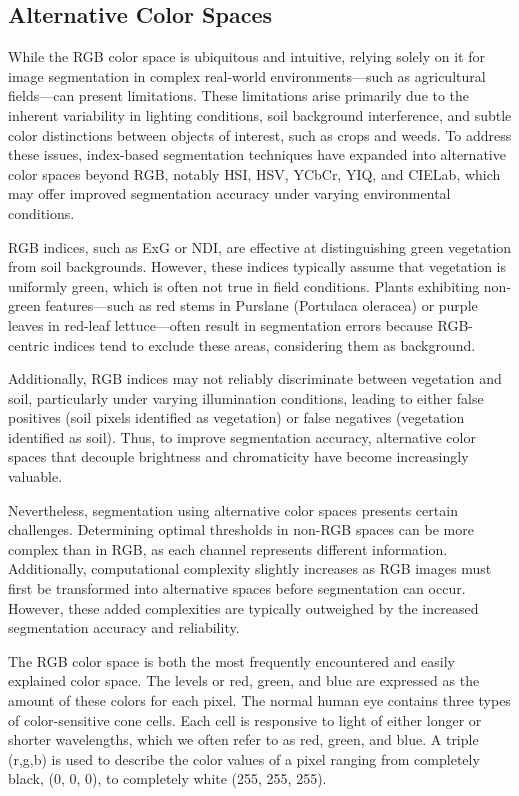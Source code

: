 \documentclass[letterpaper]{report}
\begin{document}
{\subsection{Alternative Color Spaces}
While the RGB color space is ubiquitous and intuitive, relying solely on it for image segmentation in complex real-world environments—such as agricultural fields—can present limitations. These limitations arise primarily due to the inherent variability in lighting conditions, soil background interference, and subtle color distinctions between objects of interest, such as crops and weeds. To address these issues, index-based segmentation techniques have expanded into alternative color spaces beyond RGB, notably \gls{HSI}, \gls{HSV}, YCbCr, YIQ, and CIELab, which may offer improved segmentation accuracy under varying environmental conditions.

RGB indices, such as \gls{ExG} or \gls{NDI}, are effective at distinguishing green vegetation from soil backgrounds. However, these indices typically assume that vegetation is uniformly green, which is often not true in field conditions. Plants exhibiting non-green features—such as red stems in Purslane (Portulaca oleracea) or purple leaves in red-leaf lettuce—often result in segmentation errors because RGB-centric indices tend to exclude these areas, considering them as background.

Additionally, RGB indices may not reliably discriminate between vegetation and soil, particularly under varying illumination conditions, leading to either false positives (soil pixels identified as vegetation) or false negatives (vegetation identified as soil). Thus, to improve segmentation accuracy, alternative color spaces that decouple brightness and chromaticity have become increasingly valuable.

Nevertheless, segmentation using alternative color spaces presents certain challenges. Determining optimal thresholds in non-RGB spaces can be more complex than in RGB, as each channel represents different information. Additionally, computational complexity slightly increases as RGB images must first be transformed into alternative spaces before segmentation can occur. However, these added complexities are typically outweighed by the increased segmentation accuracy and reliability.

The RGB color space is both the most frequently encountered and easily explained color space. The levels or red, green, and blue are expressed as the amount of these colors for each pixel. The normal human eye contains three types of color-sensitive cone cells. Each cell is responsive to light of either longer or shorter wavelengths, which we often refer to as red, green, and blue. A triple (r,g,b) is used to describe the color values of a pixel ranging from completely black, (0, 0, 0), to completely white (255, 255, 255).

}
\end{document}
